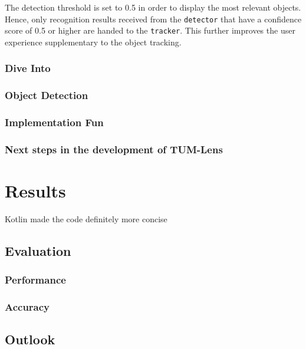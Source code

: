 \documentclass[
			   fontsize=11pt,
               paper=a4,
               bibliography=totoc,
               idxtotoc,
               headsepline,
               footsepline,
               footinclude=false,
               BCOR=12mm,
               DIV=13,
               openany,   %
               ]
               {scrbook}
\newcommand{\code}[1]{\lstinline[basicstyle = \ttfamily\small]{#1}} %
\begin{document}
The detection threshold is set to 0.5 in order to display the most relevant objects. Hence, only recognition results received from the \code{detector} that have a confidence score of 0.5 or higher are handed to the \code{tracker}. This further improves the user experience supplementary to the object tracking.


\section{Dive Into}
\section{Object Detection}
\section{Implementation Fun}

\section{Next steps in the development of TUM-Lens}


\part{Results}

Kotlin made the code definitely more concise

\chapter{Evaluation}

\section{Performance }

\section{Accuracy}

\chapter{Outlook}
\end{document}
